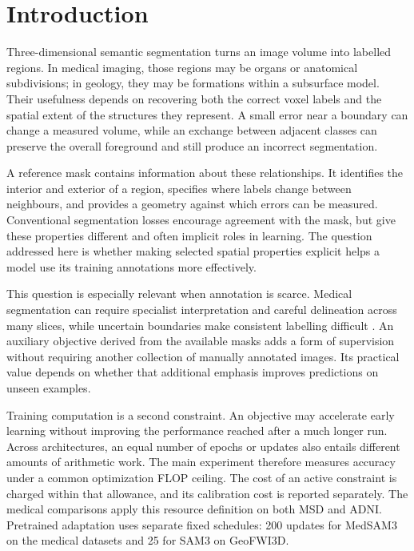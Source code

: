 \documentclass[12pt,a4paper]{article}
\begin{document}
\section{Introduction}\label{sec:introduction}
\label{sec:motivation}\label{sec:research-questions}

Three-dimensional semantic segmentation turns an image volume into labelled
regions. In medical imaging, those regions may be organs or anatomical
subdivisions; in geology, they may be formations within a subsurface model.
Their usefulness depends on recovering both the correct voxel labels and
the spatial extent of the structures they represent. A small error near a
boundary can change a measured volume, while an exchange between adjacent
classes can preserve the overall foreground and still produce an incorrect
segmentation.

A reference mask contains information about these relationships. It
identifies the interior and exterior of a region, specifies where labels
change between neighbours, and provides a geometry against which errors
can be measured. Conventional segmentation losses encourage agreement
with the mask, but give these properties different and often implicit
roles in learning. The question addressed here is whether making selected
spatial properties explicit helps a model use its training annotations
more effectively.

This question is especially relevant when annotation is scarce. Medical
segmentation can require specialist interpretation and careful delineation
across many slices, while uncertain boundaries make consistent labelling
difficult \cite{wang2021annotation}. An auxiliary objective derived from
the available masks adds a form of supervision without requiring another
collection of manually annotated images. Its practical value depends on
whether that additional emphasis improves predictions on unseen examples.

Training computation is a second constraint. An objective may accelerate
early learning without improving the performance reached after a much
longer run. Across architectures, an equal number of epochs or updates
also entails different amounts of arithmetic work. The main experiment
therefore measures accuracy under a common optimization FLOP ceiling.
The cost of an active constraint is charged within that allowance, and
its calibration cost is reported separately. The medical comparisons apply this resource definition on both MSD
and ADNI. Pretrained adaptation uses separate fixed schedules: 200 updates
for MedSAM3 on the medical datasets and 25 for SAM3 on GeoFWI3D.
\end{document}
